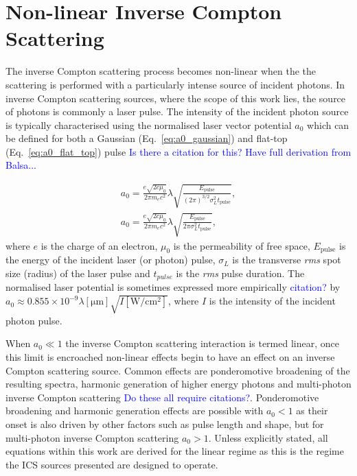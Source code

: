 \documentclass[../main.tex]{subfiles}
\begin{document}
\section{Non-linear Inverse Compton Scattering}

The inverse Compton scattering process becomes non-linear when the the scattering is performed with a particularly intense source of incident photons. In inverse Compton scattering sources, where the scope of this work lies, the source of photons is commonly a laser pulse. The intensity of the incident photon source is typically characterised using the normalised laser vector potential $a_{0}$ which can be defined for both a Gaussian (Eq.~\ref{eq:a0_gaussian}) and flat-top (Eq.~\ref{eq:a0_flat_top}) pulse \textcolor{blue}{Is there a citation for this? Have full derivation from Balsa...}

\begin{gather}
a_{0} = \frac{e\sqrt{2c\mu_{0}}}{2\pi m_{e}c^{2}}\lambda\sqrt{\frac{E_{\mathrm{pulse}}}{\left(2\pi\right)^{3/2}\sigma_{L}^{2}t_{\mathrm{pulse}}}},
\label{eq:a0_gaussian} \\
a_{0} = \frac{e\sqrt{2c\mu_{0}}}{2\pi m_{e}c^{2}}\lambda\sqrt{\frac{E_{\mathrm{pulse}}}{2\pi\sigma_{L}^{2}t_{\mathrm{pulse}}}},
\label{eq:a0_flat_top}
\end{gather}
where $e$ is the charge of an electron, $\mu_{0}$ is the permeability of free space, $E_{\mathrm{pulse}}$ is the energy of the incident laser (or photon) pulse, $\sigma_{L}$ is the transverse \textit{rms} spot size (radius) of the laser pulse and $t_{pulse}$ is the \textit{rms} pulse duration. The normalised laser potential is sometimes expressed more empirically \textcolor{blue}{citation?} by $a_{0} \approx 0.855\times 10^{-9} \lambda\left[\mathrm{\mu m}\right]\sqrt{I\left[\mathrm{W/cm^{2}}\right]}$, where $I$ is the intensity of the incident photon pulse.

When $a_{0} \ll 1$ the inverse Compton scattering interaction is termed linear, once this limit is encroached non-linear effects begin to have an effect on an inverse Compton scattering source. Common effects are ponderomotive broadening of the resulting spectra, harmonic generation of higher energy photons and multi-photon inverse Compton scattering \textcolor{blue}{Do these all require citations?}. Ponderomotive broadening and harmonic generation effects are possible with $a_{0}<1$ as their onset is also driven by other factors such as pulse length and shape, but for multi-photon inverse Compton scattering $a_{0}>1$. Unless explicitly stated, all equations within this work are derived for the linear regime as this is the regime the ICS sources presented are designed to operate.
\end{document}
